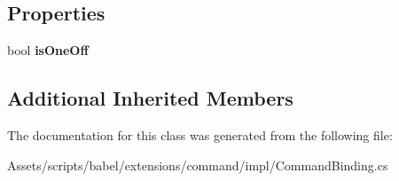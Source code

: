 \subsection*{Properties}
\begin{DoxyCompactItemize}
\item 
\hypertarget{classbabel_1_1extensions_1_1command_1_1impl_1_1_command_binding_aa6de3801a1dff99bf64850b71ef691c0}{bool {\bfseries is\-One\-Off}}\label{classbabel_1_1extensions_1_1command_1_1impl_1_1_command_binding_aa6de3801a1dff99bf64850b71ef691c0}

\end{DoxyCompactItemize}
\subsection*{Additional Inherited Members}


The documentation for this class was generated from the following file\-:\begin{DoxyCompactItemize}
\item 
Assets/scripts/babel/extensions/command/impl/Command\-Binding.\-cs\end{DoxyCompactItemize}
